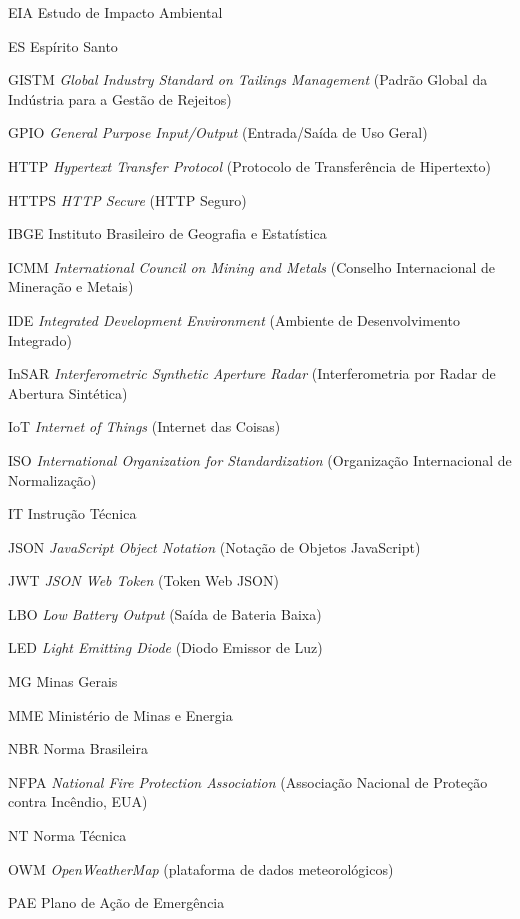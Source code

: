 \begin{siglas}
    \item[EIA] Estudo de Impacto Ambiental
    \item[ES] Espírito Santo
    \item[GISTM] \textit{Global Industry Standard on Tailings Management} (Padrão Global da Indústria para a Gestão de Rejeitos)
    \item[GPIO] \textit{General Purpose Input/Output} (Entrada/Saída de Uso Geral)
    \item[HTTP] \textit{Hypertext Transfer Protocol} (Protocolo de Transferência de Hipertexto)
    \item[HTTPS] \textit{HTTP Secure} (HTTP Seguro)
    \item[IBGE] Instituto Brasileiro de Geografia e Estatística
    \item[ICMM] \textit{International Council on Mining and Metals} (Conselho Internacional de Mineração e Metais)
    \item[IDE] \textit{Integrated Development Environment} (Ambiente de Desenvolvimento Integrado)
    \item[InSAR] \textit{Interferometric Synthetic Aperture Radar} (Interferometria por Radar de Abertura Sintética)
    \item[IoT] \textit{Internet of Things} (Internet das Coisas)
    \item[ISO] \textit{International Organization for Standardization} (Organização Internacional de Normalização)
    \item[IT] Instrução Técnica
    \item[JSON] \textit{JavaScript Object Notation} (Notação de Objetos JavaScript)
    \item[JWT] \textit{JSON Web Token} (Token Web JSON)
    \item[LBO] \textit{Low Battery Output} (Saída de Bateria Baixa)
    \item[LED] \textit{Light Emitting Diode} (Diodo Emissor de Luz)
    \item[MG] Minas Gerais
    \item[MME] Ministério de Minas e Energia
    \item[NBR] Norma Brasileira
    \item[NFPA] \textit{National Fire Protection Association} (Associação Nacional de Proteção contra Incêndio, EUA)
    \item[NT] Norma Técnica
    \item[OWM] \textit{OpenWeatherMap} (plataforma de dados meteorológicos)
    \item[PAE] Plano de Ação de Emergência

\end{siglas}
